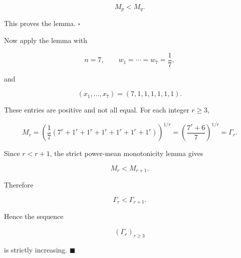 \[
M_p<M_q.
\]

This proves the lemma. \(\square\)

Now apply the lemma with

\[
n=7,
\qquad
w_1=\cdots=w_7=\frac17,
\]

and

\[
(x_1,\dots,x_7)=(7,1,1,1,1,1,1).
\]

These entries are positive and not all equal. For each integer \(r\ge 3\),

\[
M_r
=
\left(\frac17\left(7^r+1^r+1^r+1^r+1^r+1^r+1^r\right)\right)^{1/r}
=
\left(\frac{7^r+6}{7}\right)^{1/r}
=
\Gamma_r.
\]

Since \(r<r+1\), the strict power-mean monotonicity lemma gives

\[
M_r<M_{r+1}.
\]

Therefore

\[
\Gamma_r<\Gamma_{r+1}.
\]

Hence the sequence

\[
(\Gamma_r)_{r\ge 3}
\]

is strictly increasing. \(\blacksquare\)
